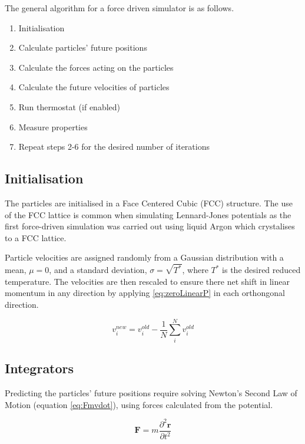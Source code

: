 \documentclass[12pt]{UoAthesis}
\begin{document}
The general algorithm for a force driven simulator is as follows. 
\begin{flushleft}
  \begin{enumerate} 
  \item Initialisation 
  \item Calculate particles' future positions 
  \item Calculate the forces acting on the particles 
  \item Calculate the future velocities of particles 
  \item Run thermostat (if enabled) 
  \item Measure properties 
  \item Repeat steps 2-6 for the desired number of iterations
  \end{enumerate} 
\end{flushleft}

\subsection{Initialisation \label{sec:initMD}} The particles are initialised in a Face Centered
Cubic (FCC)  structure. The
use of the FCC lattice is common when simulating Lennard-Jones
potentials as the first force-driven simulation \cite{Rahman1964} was
carried out using liquid Argon which crystalises to a FCC lattice.

Particle velocities are assigned randomly from a Gaussian distribution
with a mean, $\mu = 0$, and a standard deviation, $\sigma =
\sqrt{T^{*}}$, where $T^{*}$ is the desired reduced temperature. The
velocities are then rescaled to ensure there net shift in linear
momentum in any direction by applying \eqref{eq:zeroLinearP} in each
orthongonal direction.

\begin{equation} 
  v_{i}^{new} = v_{i}^{old} - \frac{1}{N}
  \sum^{N}_{i}v_{i}^{old}
  \label{eq:zeroLinearP} 
\end{equation}

\subsection{Integrators} 

Predicting the particles' future positions require solving Newton's
Second Law of Motion (equation \ref{eq:Fmvdot}), using forces
calculated from the potential.

\begin{equation} 
  \mathbf{F} = m \frac{\partial^2 \mathbf{r}}{\partial t^2}
  \label{eq:Fmvdot} 
\end{equation}
\end{document}
